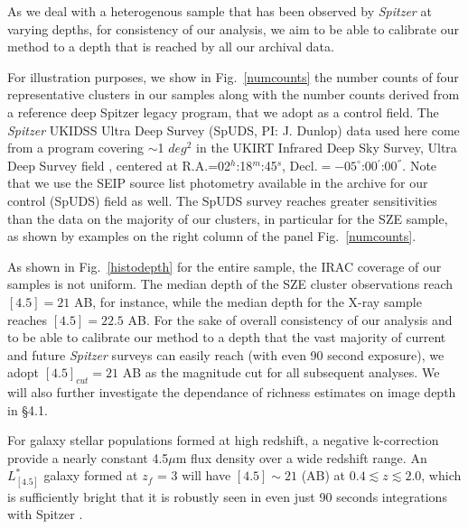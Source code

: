 \documentclass[apj,twocolumn]{emulateapj}
\begin{document}
{As we deal with a heterogenous sample that has been observed by {\it Spitzer} at varying depths, for consistency of our analysis, we aim to be able to calibrate our method to a depth that is reached by all our archival data.

For illustration purposes, we show in Fig.~\ref{numcounts} the number counts of four representative clusters in our samples along with the number counts derived from a reference deep Spitzer legacy program, that we adopt as a control field. The {\it Spitzer} UKIDSS Ultra Deep Survey (SpUDS, PI: J. Dunlop) data used here come from a program covering $\sim$1 $deg^{2}$ in the UKIRT Infrared Deep Sky Survey, Ultra Deep Survey field \citep[UKIDSS UDS][]{Dye06}, centered at R.A.=02$^{h}$:18$^{m}$:45$^{s}$, Decl.$=-05^{\circ}$:00$^{'}$:00$^{''}$.  Note that we use the SEIP source list photometry available in the archive for our control (SpUDS) field as well.  The SpUDS survey reaches greater sensitivities than the data on the majority of our clusters, in particular for the SZE sample, as shown by examples on the right column of the panel Fig.~\ref{numcounts}.

As shown in Fig.~\ref{histodepth} for the entire sample, the IRAC coverage of our samples is not uniform. The median depth  of the SZE cluster observations reach $[4.5]=21$ AB, for instance, while the median depth for the X-ray sample reaches $[4.5]=22.5$ AB. For the sake of overall consistency of our analysis and to be able to calibrate our method to a depth that the vast majority of current and future {\it Spitzer} surveys can easily reach (with even 90 second exposure), we adopt $[4.5]_{cut}=21$ AB as the magnitude cut for all subsequent analyses. We will also further investigate the dependance of richness estimates on image depth in \S4.1.

For galaxy stellar populations formed at high redshift, a negative k-correction provide a nearly constant 4.5$\mu$m flux density over a wide redshift range. An $L_{[4.5]}^{*}$ galaxy formed at $z_{f}$ = 3 will have $[4.5] \sim 21$ (AB) at $0.4 \lesssim z \lesssim 2.0$, which is sufficiently bright that it is robustly seen in even just 90 seconds integrations with Spitzer \citep[e.g.,][]{Eisenhardt08}.

}
\end{document}
